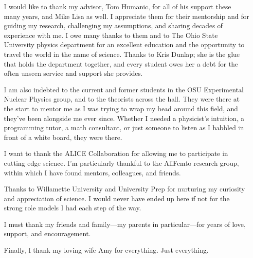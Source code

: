 \begin{acknowledgments}

I would like to thank my advisor, Tom Humanic, for all of his support these many years, and Mike Lisa as well.
I appreciate them for their mentorship and for guiding my research, challenging my assumptions, and sharing decades of experience with me.
I owe many thanks to them and to The Ohio State University physics department for an excellent education and the opportunity to travel the world in the name of science. 
Thanks to Kris Dunlap; she is the glue that holds the department together, and every student owes her a debt for the often unseen service and support she provides.

I am also indebted to the current and former students in the OSU Experimental Nuclear Physics group, and to the theorists across the hall. 
They were there at the start to mentor me as I was trying to wrap my head around this field, and they've been alongside me ever since.
Whether I needed a physicist's intuition, a programming tutor, a math consultant, or just someone to listen as I babbled in front of a white board, they were there.

I want to thank the ALICE Collaboration for allowing me to participate in cutting-edge science.
I'm particularly thankful to the AliFemto research group, within which I have found mentors, colleagues, and friends.

Thanks to Willamette University and University Prep for nurturing my curiosity and appreciation of science.
I would never have ended up here if not for the strong role models I had each step of the way.

I must thank my friends and family---my parents in particular---for years of love, support, and encouragement.

Finally, I thank my loving wife Amy for everything. Just everything.



\end{acknowledgments}
